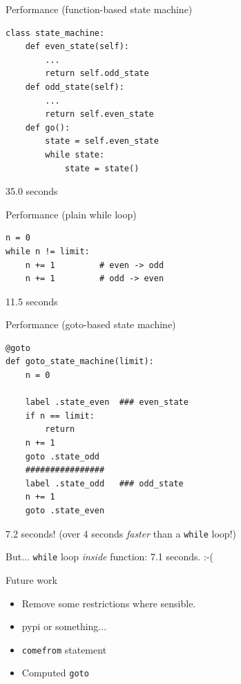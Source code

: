 \documentclass{beamer}
\begin{document}
\begin{frame}[fragile]{Performance (function-based state machine)}

\begin{verbatim}
class state_machine:
    def even_state(self):
        ...
        return self.odd_state
    def odd_state(self):
        ...
        return self.even_state
    def go():
        state = self.even_state
        while state:
            state = state()
\end{verbatim}
\alert{35.0 seconds}
\end{frame}


\begin{frame}[fragile]{Performance (plain while loop)}
\begin{verbatim}
n = 0
while n != limit:
    n += 1         # even -> odd
    n += 1         # odd -> even
\end{verbatim}
\alert{11.5 seconds}
\end{frame}

\begin{frame}[fragile]{Performance (goto-based state machine)}
\begin{verbatim}
@goto
def goto_state_machine(limit):
    n = 0

    label .state_even  ### even_state
    if n == limit:
        return
    n += 1
    goto .state_odd
    ################
    label .state_odd   ### odd_state
    n += 1
    goto .state_even
\end{verbatim}
\pause
\alert{7.2 seconds!}  (over 4 seconds \emph{faster} than a \verb!while! loop!)

\pause
But... \verb!while! loop \emph{inside} function: \alert{7.1 seconds.} :-(
\end{frame}

\begin{frame}[fragile]{Future work}

\begin{itemize}
\item Remove some restrictions where sensible.
\item pypi or something...
\item \verb!comefrom! statement
\item Computed \verb!goto!
\end{itemize}

\end{frame}
\end{document}
